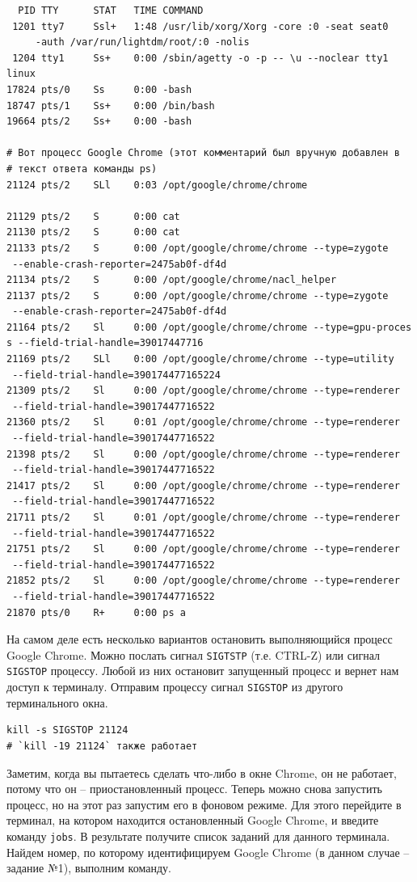 \documentclass[12pt]{article}
\begin{document}
\begin{verbatim}
  PID TTY      STAT   TIME COMMAND
 1201 tty7     Ssl+   1:48 /usr/lib/xorg/Xorg -core :0 -seat seat0
     -auth /var/run/lightdm/root/:0 -nolis
 1204 tty1     Ss+    0:00 /sbin/agetty -o -p -- \u --noclear tty1 linux
17824 pts/0    Ss     0:00 -bash
18747 pts/1    Ss+    0:00 /bin/bash
19664 pts/2    Ss+    0:00 -bash

# Вот процесс Google Chrome (этот комментарий был вручную добавлен в
# текст ответа команды ps)
21124 pts/2    SLl    0:03 /opt/google/chrome/chrome

21129 pts/2    S      0:00 cat
21130 pts/2    S      0:00 cat
21133 pts/2    S      0:00 /opt/google/chrome/chrome --type=zygote
 --enable-crash-reporter=2475ab0f-df4d
21134 pts/2    S      0:00 /opt/google/chrome/nacl_helper
21137 pts/2    S      0:00 /opt/google/chrome/chrome --type=zygote
 --enable-crash-reporter=2475ab0f-df4d
21164 pts/2    Sl     0:00 /opt/google/chrome/chrome --type=gpu-proces
s --field-trial-handle=39017447716
21169 pts/2    SLl    0:00 /opt/google/chrome/chrome --type=utility
 --field-trial-handle=390174477165224
21309 pts/2    Sl     0:00 /opt/google/chrome/chrome --type=renderer
 --field-trial-handle=39017447716522
21360 pts/2    Sl     0:01 /opt/google/chrome/chrome --type=renderer
 --field-trial-handle=39017447716522
21398 pts/2    Sl     0:00 /opt/google/chrome/chrome --type=renderer
 --field-trial-handle=39017447716522
21417 pts/2    Sl     0:00 /opt/google/chrome/chrome --type=renderer
 --field-trial-handle=39017447716522
21711 pts/2    Sl     0:01 /opt/google/chrome/chrome --type=renderer
 --field-trial-handle=39017447716522
21751 pts/2    Sl     0:00 /opt/google/chrome/chrome --type=renderer
 --field-trial-handle=39017447716522
21852 pts/2    Sl     0:00 /opt/google/chrome/chrome --type=renderer
 --field-trial-handle=39017447716522
21870 pts/0    R+     0:00 ps a
\end{verbatim}

На самом деле есть несколько вариантов остановить выполняющийся процесс
Google Chrome. Можно послать сигнал \texttt{SIGTSTP} (т.е. CTRL-Z) или
сигнал \texttt{SIGSTOP} процессу. Любой из них остановит запущенный
процесс и вернет нам доступ к терминалу. Отправим процессу сигнал
\texttt{SIGSTOP} из другого терминального окна.

\begin{verbatim}
kill -s SIGSTOP 21124
# `kill -19 21124` также работает
\end{verbatim}

Заметим, когда вы пытаетесь сделать что-либо в окне Chrome, он не
работает, потому что он -- приостановленный процесс. Теперь можно снова
запустить процесс, но на этот раз запустим его в фоновом режиме. Для
этого перейдите в терминал, на котором находится остановленный Google
Chrome, и введите команду \texttt{jobs}. В результате получите список
заданий для данного терминала. Найдем номер, по которому идентифицируем
Google Chrome (в данном случае -- задание №1), выполним команду.
\end{document}
